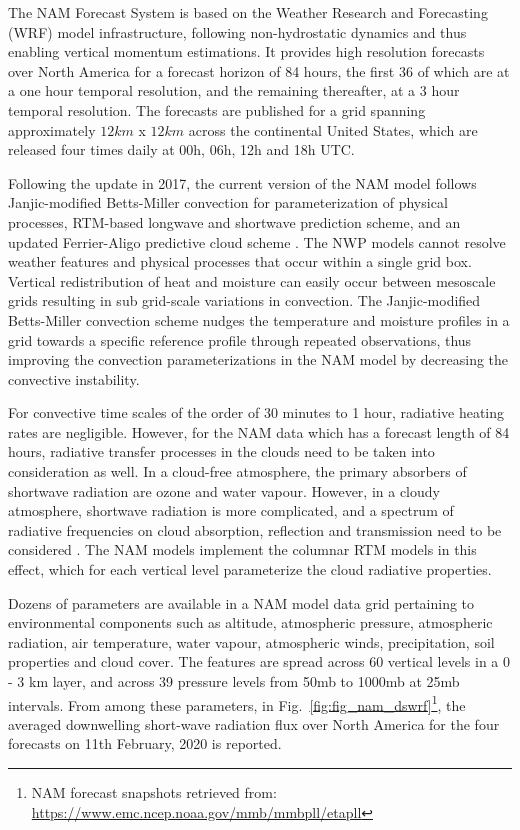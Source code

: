 \par The NAM Forecast System is based on the Weather Research and Forecasting (WRF) model infrastructure, following non-hydrostatic dynamics and thus enabling vertical momentum estimations. It provides high resolution forecasts over North America for a forecast horizon of 84 hours, the first 36 of which are at a one hour temporal resolution, and the remaining thereafter, at a 3 hour temporal resolution. The forecasts are published for a grid spanning approximately $12km$ x $12 km$ across the continental United States, which are released four times daily at 00h, 06h, 12h and 18h UTC.

\par Following the update in 2017, the current version of the NAM model follows Janjic-modified Betts-Miller convection \cite{multimodel_janjic} for parameterization of physical processes, RTM-based longwave and shortwave prediction scheme, and an updated Ferrier-Aligo predictive cloud scheme \cite{multimodel_cloud}. The NWP models cannot resolve weather features and physical processes that occur within a single grid box. Vertical redistribution of heat and moisture can easily occur between mesoscale grids resulting in sub grid-scale variations in convection. The Janjic-modified Betts-Miller convection scheme nudges the temperature and moisture profiles in a grid towards a specific reference profile through repeated observations, thus improving the convection parameterizations in the NAM model by decreasing the convective instability.

\par For convective time scales of the order of 30 minutes to 1 hour, radiative heating rates are negligible. However, for the NAM data which has a forecast length of 84 hours, radiative transfer processes in the clouds need to be taken into consideration as well. In a cloud-free atmosphere, the primary absorbers of shortwave radiation are ozone and water vapour. However, in a cloudy atmosphere, shortwave radiation is more complicated, and a spectrum of radiative frequencies on cloud absorption, reflection and transmission need to be considered \cite{multimodel_rtm}. The NAM models implement the columnar RTM models in this effect, which for each vertical level parameterize the cloud radiative properties.

\par Dozens of parameters are available in a NAM model data grid pertaining to environmental components such as altitude, atmospheric pressure, atmospheric radiation, air temperature, water vapour, atmospheric winds, precipitation, soil properties and cloud cover. The features are spread across 60 vertical levels in a 0 - 3 km layer, and across 39 pressure levels from 50mb to 1000mb at 25mb intervals. From among these parameters, in Fig.~\ref{fig:fig_nam_dswrf}\footnote{NAM forecast snapshots retrieved from: \url{https://www.emc.ncep.noaa.gov/mmb/mmbpll/etapll}}, the averaged downwelling short-wave radiation flux over North America for the four forecasts on 11th February, 2020 is reported.


